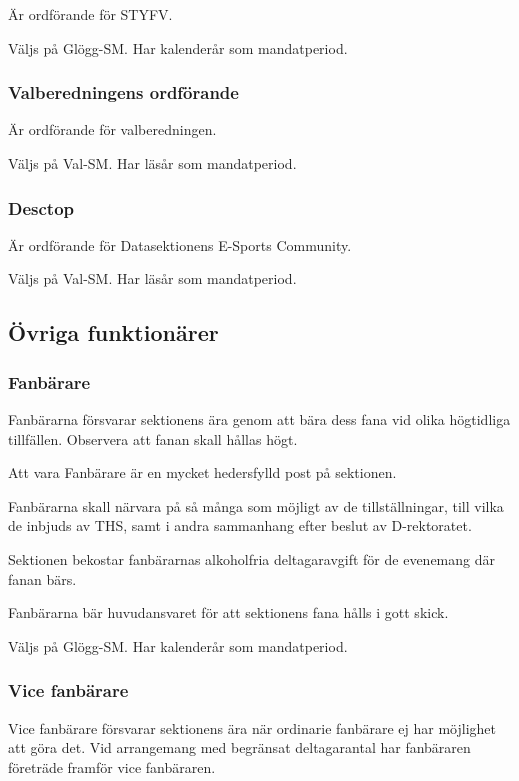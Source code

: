 \documentclass{dgovdoc}
\begin{document}
Är ordförande för STYFV.

Väljs på Glögg-SM. Har kalenderår som mandatperiod.

\subsubsection{Valberedningens ordförande}

Är ordförande för valberedningen.

Väljs på Val-SM. Har läsår som mandatperiod.

\subsubsection{Desctop}

Är ordförande för Datasektionens E-Sports Community.

Väljs på Val-SM. Har läsår som mandatperiod.

\subsection{Övriga funktionärer}

\subsubsection{Fanbärare}

Fanbärarna försvarar sektionens ära genom att bära dess fana vid olika
högtidliga tillfällen. Observera att fanan skall hållas högt.

Att vara Fanbärare är en mycket hedersfylld post på sektionen.

Fanbärarna skall närvara på så många som möjligt av de tillställningar, till
vilka de inbjuds av THS, samt i andra sammanhang efter beslut av D-rektoratet.

Sektionen bekostar fanbärarnas alkoholfria deltagaravgift för de evenemang där
fanan bärs.

Fanbärarna bär huvudansvaret för att sektionens fana hålls i gott skick.

Väljs på Glögg-SM. Har kalenderår som mandatperiod.

\subsubsection{Vice fanbärare}

Vice fanbärare försvarar sektionens ära när ordinarie fanbärare ej har
möjlighet att göra det. Vid arrangemang med begränsat deltagarantal har
fanbäraren företräde framför vice fanbäraren.
\end{document}
